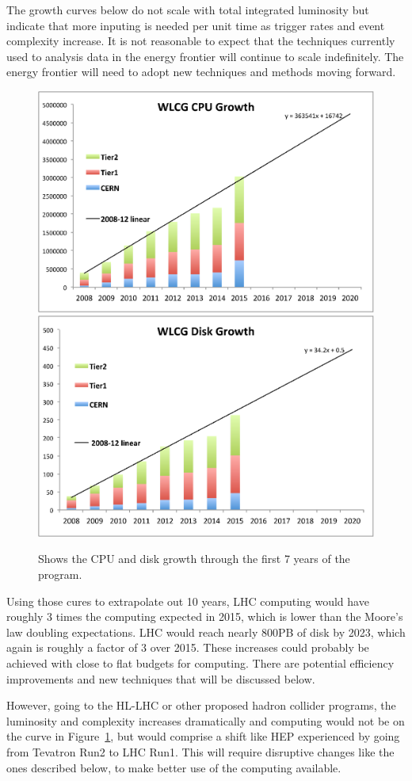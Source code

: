The growth curves below do not scale
with total integrated luminosity but indicate that more inputing is
needed per unit time as trigger rates and event complexity increase.
It is not reasonable to expect that the techniques currently used to
analysis data in the energy frontier will continue to scale
indefinitely.  The energy frontier will need to adopt new techniques
and methods moving forward.

\begin{figure}[htb]
\begin{center}
\includegraphics[width=0.45\hsize]{CpF-E2/Growth1.eps}
\includegraphics[width=0.45\hsize]{CpF-E2/Growth2.eps}
\caption{Shows the CPU and disk growth through the first 7 years of the program.}
\label{fig:growth}
\end{center}
\end{figure}


Using those cures to extrapolate out 10 years,  LHC computing would have
roughly 3 times the computing expected in 2015, which is lower than the
Moore's law doubling expectations.  LHC would reach nearly 800PB of disk by
2023, which again is roughly a factor of 3 over 2015.   These increases could
probably be achieved with close to flat budgets for computing.   There are
potential efficiency improvements and new techniques that will be discussed
below.

However, going to the HL-LHC or other proposed hadron collider programs,  the
luminosity and complexity increases dramatically and computing would not be on
the curve in Figure~\ref{fig:growth}, but would comprise a shift like HEP
experienced by going from Tevatron Run2 to LHC Run1.
This will require disruptive changes like the ones described  below, to make
better use of the computing available.


